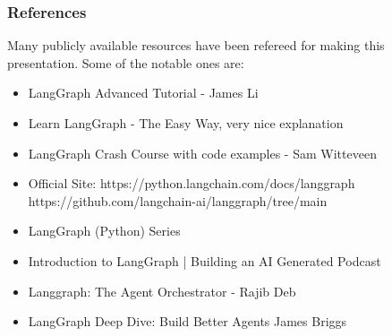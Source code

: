 

\begin{frame}\frametitle{References}
Many publicly available resources have been refereed for making this presentation. Some of the notable ones are:
\footnotesize
\begin{itemize}
\item LangGraph Advanced Tutorial  - James Li
\item Learn LangGraph - The Easy Way, very nice explanation
\item LangGraph Crash Course with code examples - Sam Witteveen 
\item Official Site: https://python.langchain.com/docs/langgraph https://github.com/langchain-ai/langgraph/tree/main
\item LangGraph (Python) Series
\item Introduction to LangGraph | Building an AI Generated Podcast 
\item Langgraph: The Agent Orchestrator - Rajib Deb 
\item LangGraph Deep Dive: Build Better Agents James Briggs 
\end{itemize}

\end{frame}